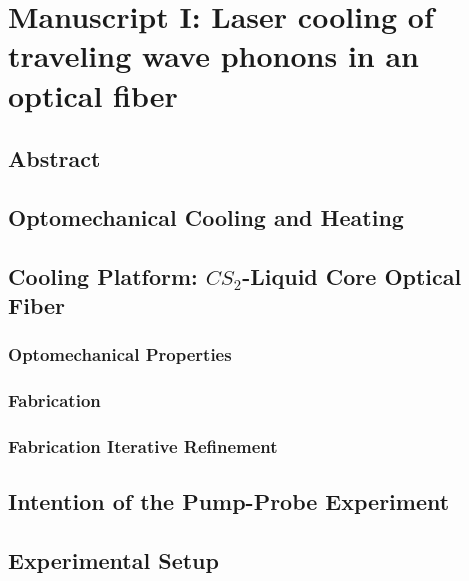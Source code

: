 \setcounter{rownumber}{0}
\singlespacing
\chapter{Manuscript I: Laser cooling of traveling wave phonons in an optical fiber}
\label{ch:Cooling}
\acresetall

\section{Abstract}
\label{sec:Cooling:Abstract}
\lipsum[1]

\section{Optomechanical Cooling and Heating}
\label{sec:Cooling:Cooling-Heating}
\lipsum[1]

\section{Cooling Platform: \texorpdfstring{$CS_{2}$}{CS2}-Liquid Core Optical Fiber}
\label{sec:Cooling:Platform}
\lipsum[1]

  \subsection{Optomechanical Properties}
  \label{subsec:Cooling:Platform:Properties}
  \lipsum[1]

  \subsection{Fabrication}
  \label{subsec:Cooling:Platform:Fabrication}
  \lipsum[1]

  \subsection{Fabrication Iterative Refinement}
  \label{subsec:Cooling:Platform:Refinement}
  \lipsum[1]

\section{Intention of the Pump-Probe Experiment}
\label{sec:Cooling:Intention}
\lipsum[1]

\section{Experimental Setup}
\label{sec:Cooling:Setup}
\lipsum[1]

